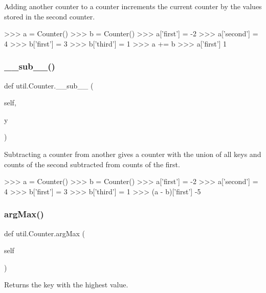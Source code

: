 \begin{DoxyVerb}Adding another counter to a counter increments the current counter
by the values stored in the second counter.

>>> a = Counter()
>>> b = Counter()
>>> a['first'] = -2
>>> a['second'] = 4
>>> b['first'] = 3
>>> b['third'] = 1
>>> a += b
>>> a['first']
1
\end{DoxyVerb}
 \mbox{\label{classutil_1_1_counter_a541fd5f4f74e910852c589ff23b4b280}} 
\subsubsection{\texorpdfstring{\+\_\+\+\_\+sub\+\_\+\+\_\+()}{\_\_sub\_\_()}}
{\footnotesize\ttfamily def util.\+Counter.\+\_\+\+\_\+sub\+\_\+\+\_\+ (\begin{DoxyParamCaption}\item[{}]{self,  }\item[{}]{y }\end{DoxyParamCaption})}

\begin{DoxyVerb}Subtracting a counter from another gives a counter with the union of all keys and
counts of the second subtracted from counts of the first.

>>> a = Counter()
>>> b = Counter()
>>> a['first'] = -2
>>> a['second'] = 4
>>> b['first'] = 3
>>> b['third'] = 1
>>> (a - b)['first']
-5
\end{DoxyVerb}
 \mbox{\label{classutil_1_1_counter_ac783df5e03c63469983b812fd5aff0c2}} 
\subsubsection{\texorpdfstring{arg\+Max()}{argMax()}}
{\footnotesize\ttfamily def util.\+Counter.\+arg\+Max (\begin{DoxyParamCaption}\item[{}]{self }\end{DoxyParamCaption})}

\begin{DoxyVerb}Returns the key with the highest value.
\end{DoxyVerb}
 \mbox{\label{classutil_1_1_counter_ac57004446c3d5a15948e7803a0af3d56}} 
